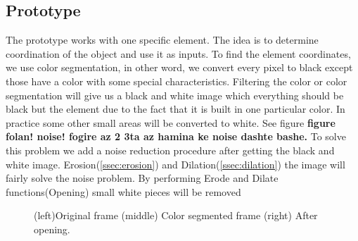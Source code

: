 \subsection{Prototype}
The prototype works with one specific element. The idea is to determine coordination of the object and use it as inputs. To find the element coordinates, we use color segmentation, in other word, we convert every pixel to black except those have a color with some special characteristics. Filtering the color or color segmentation will give us a black and white image which everything should be black but the element due to the fact that it is built in one particular color. In practice some other small areas will be converted to white. See figure \textbf{figure folan! noise! fogire az 2 3ta az hamina ke noise dashte bashe.} To solve this problem we add a noise reduction procedure after getting the black and white image. Erosion(\ref{ssec:erosion}) and Dilation(\ref{ssec:dilation})  the image will fairly solve the noise problem. By performing Erode and Dilate functions(Opening) small white pieces will be removed

\begin{figure}
\caption{(left)Original frame (middle) Color segmented frame (right) After opening.}
\label{fig:blue}
\end{figure}
 
